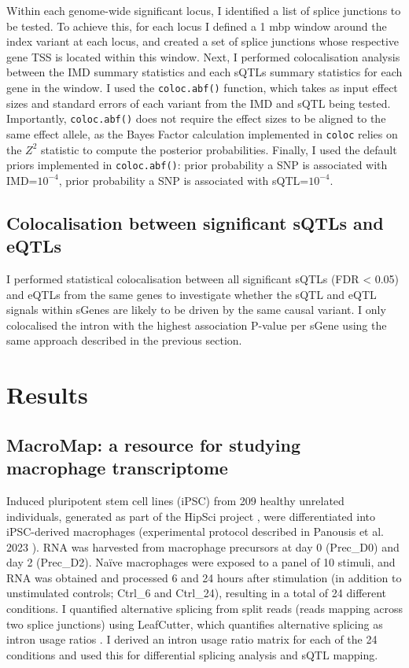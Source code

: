 Within each genome-wide significant locus, I identified a list of splice junctions to be tested. To achieve this, for each locus I defined a 1 mbp window around the index variant at each locus, and created a set of splice junctions whose respective gene TSS is located within this window. Next, I performed colocalisation analysis between the IMD summary statistics and each sQTLs summary statistics for each gene in the window. I used the \Verb+coloc.abf()+ function, which takes as input effect sizes and standard errors of each variant from the IMD  and sQTL being tested. Importantly, \Verb+coloc.abf()+ does not require the effect sizes to be aligned to the same effect allele, as the Bayes Factor calculation implemented in \Verb+coloc+ relies on the $Z^{2}$ statistic to compute the posterior probabilities. Finally, I used the default priors implemented in \Verb+coloc.abf()+: prior probability a SNP is associated with IMD=$10^{-4}$, prior probability a SNP is associated with sQTL=$10^{-4}$.
\subsection{Colocalisation between significant sQTLs and eQTLs}
I performed statistical colocalisation between all significant sQTLs (FDR < 0.05) and eQTLs from the same genes to investigate whether the sQTL and eQTL signals within sGenes are likely to be driven by the same causal variant. I only colocalised the intron with the highest association P-value per sGene using the same approach described in the previous section.
\newpage
\section{Results}

\subsection{MacroMap: a resource for studying macrophage transcriptome}

Induced pluripotent stem cell lines (iPSC) from 209 healthy unrelated individuals, generated as part of the HipSci project \cite{Kilpinen2017-qm}, were differentiated into iPSC-derived macrophages (experimental protocol described in Panousis et al. 2023 \cite{macromap-eqtl}). RNA was harvested from macrophage precursors at day 0 (Prec\_D0) and day 2 (Prec\_D2).
Naïve macrophages were exposed to a panel of 10 stimuli, and RNA was obtained and processed 6 and 24 hours after stimulation (in addition to unstimulated controls; Ctrl\_6 and Ctrl\_24), resulting in a total of 24 different conditions. I quantified alternative splicing from split reads (reads mapping across two splice junctions) using LeafCutter, which quantifies alternative splicing as intron usage ratios \cite{Li2018-ll}. I derived an intron usage ratio matrix for each of the 24 conditions and used this for differential splicing analysis and sQTL mapping.\\

